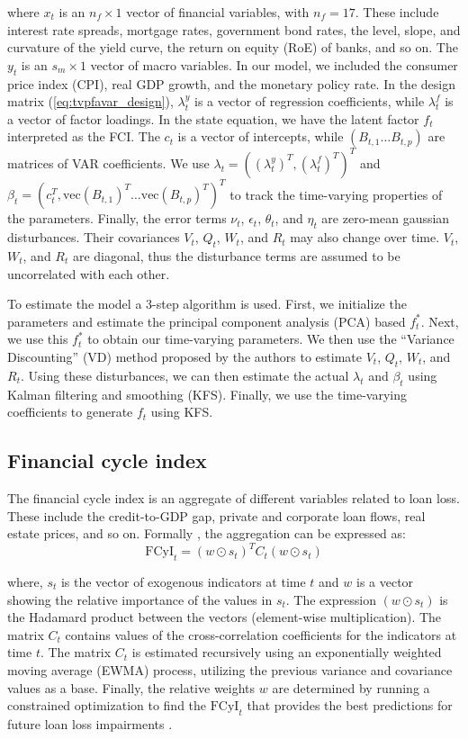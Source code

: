 where $x_t$ is an $n_f\times1$ vector of financial variables, with $n_f=17$. These include interest rate spreads, mortgage rates, government bond rates, the level, slope, and curvature of the yield curve, the return on equity (RoE) of banks, and so on. The $y_t$ is an $s_m\times1$ vector of macro variables. In our model, we included the consumer price index (CPI), real GDP growth, and the monetary policy rate. In the design matrix (\autoref{eq:tvpfavar_design}), $\lambda_t^y$ is a vector of regression coefficients, while $\lambda_t^f$ is a vector of factor loadings. In the state equation, we have the latent factor $f_t$ interpreted as the FCI. The $c_t$ is a vector of intercepts, while $(B_{t,1} \dots B_{t,p})$ are matrices of VAR coefficients. We use $\lambda_t=\left((\lambda_t^y)^T,(\lambda_t^f)^T \right)^T$ and $\beta_t=\left(c_t^T,\text{vec}(B_{t,1})^T \dots \text{vec}(B_{t,p})^T\right)^T$ to track the time-varying properties of the parameters. Finally, the error terms $\nu_t$, $\epsilon_t$, $\theta_t$, and $\eta_t$ are zero-mean gaussian disturbances. Their covariances $V_t$, $Q_t$, $W_t$, and $R_t$ may also change over time. $V_t$, $W_t$, and $R_t$ are diagonal, thus the disturbance terms are assumed to be uncorrelated with each other.

To estimate the model a 3-step algorithm is used. First, we initialize the parameters and estimate the principal component analysis (PCA) based $f_t^*$. Next, we use this $f_t^*$ to obtain our time-varying parameters. We then use the “Variance Discounting” (VD) method proposed by the authors \citep{koop_2013} to estimate $V_t$, $Q_t$, $W_t$, and $R_t$. Using these disturbances, we can then estimate the actual $\lambda_t$ and $\beta_t$ using Kalman filtering and smoothing (KFS). Finally, we use the time-varying coefficients to generate $f_t$ using KFS.

\subsection{Financial cycle index}
The financial cycle index is an aggregate of different variables related to loan loss. These include the credit-to-GDP gap, private and corporate loan flows, real estate prices, and so on. Formally \citep{hollo2012}, the aggregation can be expressed as:
\begin{equation}
    \label{eq:fcyi}
    \text{FCyI}_t = (w\odot s_t)^T C_t (w\odot s_t)
\end{equation}

where, $s_t$ is the vector of exogenous indicators at time $t$ and $w$ is a vector showing the relative importance of the values in $s_t$. The expression $(w\odot s_t)$ is the Hadamard product between the vectors (element-wise multiplication). The matrix $C_t$ contains values of the cross-correlation coefficients for the indicators at time $t$. The matrix $C_t$ is estimated recursively using an exponentially weighted moving average (EWMA) process, utilizing the previous variance and covariance values as a base. Finally, the relative weights $w$ are determined by running a constrained optimization to find the $\text{FCyI}_t$ that provides the best predictions for future loan loss impairments \citep{plasil2014}.

